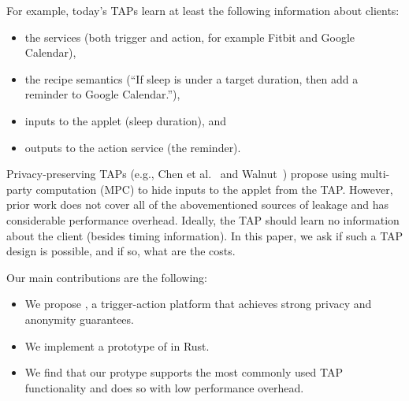 For example, today's TAPs learn at least the following information about clients:
\begin{itemize}
  \item the services (both trigger and action, for example Fitbit and Google Calendar),
  \item the recipe semantics (``If sleep is under a target duration, then add a
    reminder to Google Calendar.''),
  \item inputs to the applet (sleep duration), and
  \item outputs to the action service (the reminder).
\end{itemize}

Privacy-preserving TAPs (e.g., Chen et al.~\cite{DBLP:conf/sp/ChenCWSCF21} and
Walnut~\cite{DBLP:journals/corr/abs-2009-12447}) propose using multi-party
computation (MPC) to hide inputs to the applet from the TAP. However, prior work
does not cover all of the abovementioned sources of leakage and has considerable
performance overhead. Ideally, the TAP should learn no information about the
client (besides timing information). In this paper, we ask if such a TAP design
is possible, and if so, what are the costs.

Our main contributions are the following:
\begin{itemize}
  \item We propose \sys, a trigger-action platform that achieves strong privacy
    and anonymity guarantees.
  \item We implement a prototype of \sys in Rust.
  \item We find that our \sys protype supports the most commonly used TAP
    functionality and does so with low performance overhead.
\end{itemize}
